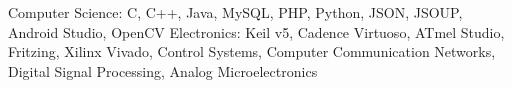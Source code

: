 \begin{cvhonors}
  \cvhonor
    {Computer Science: }
    {C, C++, Java, MySQL, PHP, Python, JSON, JSOUP, Android Studio, OpenCV}
    {}
    {}
  \cvhonor
    {Electronics:}
    { Keil v5, Cadence Virtuoso, ATmel Studio, Fritzing, Xilinx Vivado, Control Systems, Computer Communication Networks, Digital Signal Processing, Analog Microelectronics}
    {}
    {}
\end{cvhonors}
